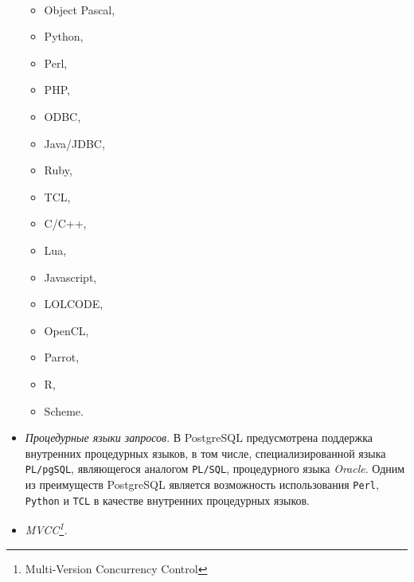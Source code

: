 \documentclass[a4paper,12pt,notitlepage,headsepline,pdftex]{scrartcl}
\begin{document}
\begin{itemize}
      \begin{minipage}{0.26\textwidth}
        \begin{itemize}\tt
          \item Object Pascal,
          \item Python,
          \item Perl,
          \item PHP,
        \end{itemize}
      \end{minipage}
      \begin{minipage}{0.25\textwidth}
        \begin{itemize}\tt
          \item ODBC,
          \item Java/JDBC,
          \item Ruby,
          \item TCL,
        \end{itemize}
      \end{minipage}
      \begin{minipage}{0.25\textwidth}
        \begin{itemize}\tt
          \item C/C++,
          \item Lua,
          \item Javascript,
          \item LOLCODE,
        \end{itemize}
      \end{minipage}
      \begin{minipage}{0.20\textwidth}
        \begin{itemize}\tt
          \item OpenCL,
          \item Parrot,
          \item R,
          \item Scheme.
        \end{itemize}
      \end{minipage}
    \item \emph{Процедурные языки запросов}.
      В PostgreSQL предусмотрена поддержка внутренних процедурных языков, в
      том числе, специализированной языка \texttt{PL/pgSQL}, являющегося
      аналогом \texttt{PL/SQL}, процедурного языка \emph{Oracle}.
      Одним из преимуществ PostgreSQL является возможность использования
      \texttt{Perl}, \texttt{Python} и \texttt{TCL} в качестве внутренних
      процедурных языков.
    \item \emph{MVCC\footnote{Multi-Version Concurrency Control}.}

\end{itemize}
\end{document}

